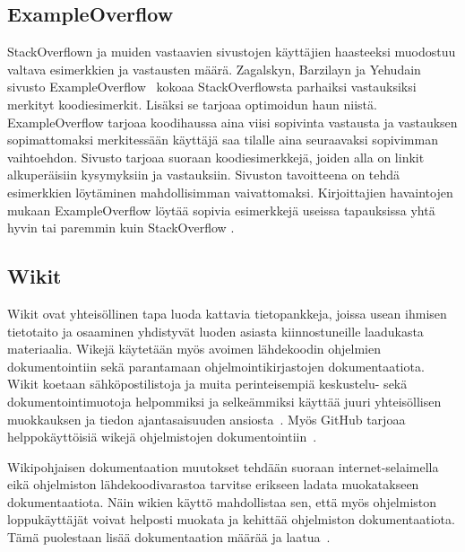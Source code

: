 \documentclass[finnish]{tktltiki2}
\theoremstyle{definition}
\theoremstyle{remark}
\begin{document}
\subsection{ExampleOverflow}
\label{ch:exampleoverflow}
StackOverflown ja muiden vastaavien sivustojen käyttäjien haasteeksi muodostuu valtava esimerkkien ja vastausten määrä. Zagalskyn, Barzilayn ja Yehudain sivusto ExampleOverflow~\cite{example-overflow-social-media-for-code-recommendations} kokoaa StackOverflowsta parhaiksi vastauksiksi merkityt koodiesimerkit. Lisäksi se tarjoaa optimoidun haun niistä. ExampleOverflow tarjoaa koodihaussa aina viisi sopivinta vastausta ja vastauksen sopimattomaksi merkitessään käyttäjä saa tilalle aina seuraavaksi sopivimman vaihtoehdon. Sivusto tarjoaa suoraan koodiesimerkkejä, joiden alla on linkit alkuperäisiin kysymyksiin ja vastauksiin. Sivuston tavoitteena on tehdä esimerkkien löytäminen mahdollisimman vaivattomaksi. Kirjoittajien havaintojen mukaan ExampleOverflow löytää sopivia esimerkkejä useissa tapauksissa yhtä hyvin tai paremmin kuin StackOverflow \cite{example-overflow-social-media-for-code-recommendations}.

\subsection{Wikit}
\label{ch:wiki}
Wikit ovat yhteisöllinen tapa luoda kattavia tietopankkeja, joissa usean ihmisen tietotaito ja osaaminen yhdistyvät luoden asiasta kiinnostuneille laadukasta materiaalia. Wikejä käytetään myös avoimen lähdekoodin ohjelmien dokumentointiin sekä parantamaan ohjelmointikirjastojen dokumentaatiota. Wikit koetaan sähköpostilistoja ja muita perinteisempiä keskustelu- sekä dokumentointimuotoja helpommiksi ja selkeämmiksi käyttää juuri yhteisöllisen muokkauksen ja tiedon ajantasaisuuden ansiosta~\cite{using-wikis-in-sw}.
Myös GitHub tarjoaa helppokäyttöisiä wikejä ohjelmistojen dokumentointiin~\cite{github-wiki}.

Wikipohjaisen dokumentaation muutokset tehdään suoraan internet-selaimella eikä ohjelmiston lähdekoodivarastoa tarvitse erikseen ladata muokatakseen dokumentaatiota. Näin wikien käyttö mahdollistaa sen, että myös ohjelmiston loppukäyttäjät voivat helposti muokata ja kehittää ohjelmiston dokumentaatiota. Tämä puolestaan lisää dokumentaation määrää ja laatua~\cite{wiki-social-knowledge-construction}.

\end{document}
